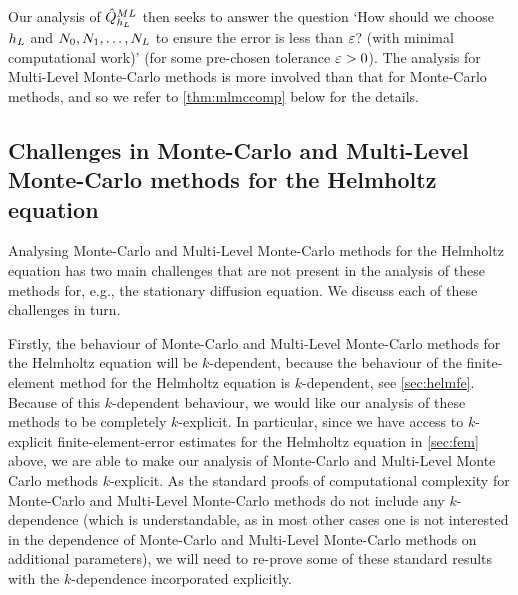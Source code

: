 Our analysis of $\hat{Q}^{ML}_{h_{L}}$ then seeks to answer the question `How should we choose $h_{L}$ and $N_{0},N_{1},\ldots,N_{L}$ to ensure the error is less than $\varepsilon$? (with minimal computational work)' (for some pre-chosen tolerance $\varepsilon > 0$). The analysis for Multi-Level Monte-Carlo methods is more involved than that for Monte-Carlo methods, and so we refer to \cref{thm:mlmccomp} below for the details.

\subsection{Challenges in Monte-Carlo and Multi-Level Monte-Carlo methods for the Helmholtz equation}

Analysing Monte-Carlo and Multi-Level Monte-Carlo methods for the Helmholtz equation has two main challenges that are not present in the analysis of these methods for, e.g., the stationary diffusion equation. We discuss each of these challenges in turn.

Firstly, the behaviour of Monte-Carlo and Multi-Level Monte-Carlo methods for the Helmholtz equation will be $k$-dependent, because the behaviour of the finite-element method for the Helmholtz equation is $k$-dependent, see \cref{sec:helmfe}. Because of this $k$-dependent behaviour, we would like our analysis of these methods to be completely $k$-explicit. In particular, since we have access to $k$-explicit finite-element-error estimates for the Helmholtz equation in \cref{sec:fem} above, we are able to make our analysis of Monte-Carlo and Multi-Level Monte Carlo methods $k$-explicit.  As the standard proofs of computational complexity for Monte-Carlo and Multi-Level Monte-Carlo methods do not include any $k$-dependence (which is understandable, as in most other cases one is not interested in the dependence of Monte-Carlo and Multi-Level Monte-Carlo methods on additional parameters), we will need to re-prove some of these standard results with the $k$-dependence incorporated explicitly.

